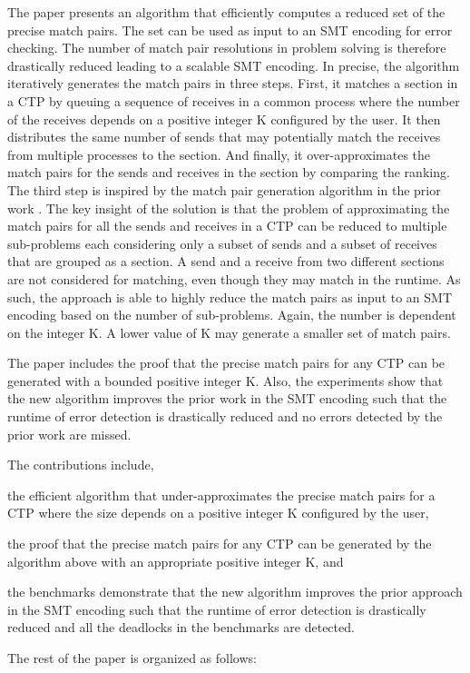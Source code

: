 The paper presents an algorithm that efficiently computes a reduced set of the precise match pairs. The set can be used as input to an SMT encoding for error checking. The number of match pair resolutions in problem solving is therefore drastically reduced leading to a scalable SMT encoding. In precise, the algorithm iteratively generates the match pairs in three steps. First, it matches a section in a CTP by queuing a sequence of receives in a common process where the number of the receives depends on a positive integer K configured by the user. It then distributes the same number of sends that may potentially match the receives from multiple processes to the section. And finally, it over-approximates the match pairs for the sends and receives in the section by comparing the ranking. The third step is inspired by the match pair generation algorithm in the prior work \cite{}. The key insight of the solution is that the problem of approximating the match pairs for all the sends and receives in a CTP can be reduced to multiple sub-problems each considering only a subset of sends and a subset of receives that are grouped as a section. A send and a receive from two different sections are not considered for matching, even though they may match in the runtime. As such, the approach is able to highly reduce the match pairs as input to an SMT encoding based on the number of sub-problems. Again, the number is dependent on the integer K. A lower value of K may generate a smaller set of match pairs. 

The paper includes the proof that the precise match pairs for any CTP can be generated with a bounded positive integer K. Also, the experiments show that the new algorithm improves the prior work in the SMT encoding such that the runtime of error detection is drastically reduced and no errors detected by the prior work are missed.


The contributions include,
\begin{compactitem}
\item the efficient algorithm that under-approximates the precise match pairs for a CTP where the size depends on a positive integer K configured by the user,
\item the proof that the precise match pairs for any CTP can be generated by the algorithm above with an appropriate positive integer K, and
\item the benchmarks demonstrate that the new algorithm improves the prior approach in the SMT encoding such that the runtime of error detection is drastically reduced and all the deadlocks in the benchmarks are detected. 
\end{compactitem}

The rest of the paper is organized as follows:
